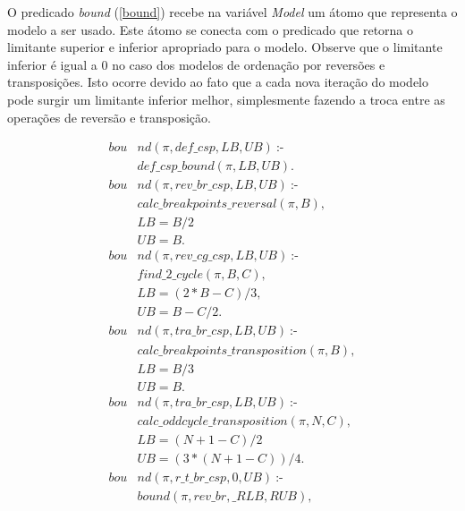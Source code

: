 O predicado \textit{bound} (\ref{bound}) recebe na
variável \textit{Model} um átomo que representa o modelo a ser
usado. Este átomo se conecta com o predicado que retorna o limitante
superior e inferior apropriado para o modelo. Observe que o limitante
inferior é igual a $0$ no caso dos modelos de ordenação por reversões
e transposições. Isto ocorre devido ao fato que a cada nova iteração
do modelo pode surgir um limitante inferior melhor, simplesmente
fazendo a troca entre as operações de reversão e transposição.

\begin{align}
  \label{bound}
  \textit{bou}&\textit{nd}(\pi, def\_csp, LB, UB)~\text{:-} \nonumber\\
  &\textit{def\_csp\_bound}(\pi, LB, UB). \nonumber \\
  \textit{bou}&\textit{nd}(\pi, rev\_br\_csp, LB, UB)~\text{:-} \nonumber \\
  &\textit{calc\_breakpoints\_reversal}(\pi, B), \nonumber\\
  &LB = B / 2 \nonumber \\ %
  &UB = B. \nonumber \\
  \textit{bou}&\textit{nd}(\pi, rev\_cg\_csp, LB, UB)~\text{:-} \nonumber \\
  &\textit{find\_2\_cycle}(\pi, B, C), \nonumber\\
  &LB = (2 * B - C) / 3 , \nonumber  \\
  &UB = B - C / 2. \nonumber \\
  \textit{bou}&\textit{nd}(\pi, tra\_br\_csp, LB, UB)~\text{:-} \nonumber\\
  &\textit{calc\_breakpoints\_transposition}(\pi, B), \nonumber\\
  &LB = B / 3 \nonumber \\ %
  &UB = B.  \nonumber \\
  \textit{bou}&\textit{nd}(\pi, tra\_br\_csp, LB, UB)~\text{:-} \\
  &\textit{calc\_oddcycle\_transposition}(\pi, N, C), \nonumber\\
  &LB = (N + 1 - C) / 2 \nonumber \\ 
  &UB = (3 * (N + 1 - C)) / 4. \nonumber \\
  \textit{bou}&\textit{nd}(\pi, r\_t\_br\_csp, 0, UB)~\text{:-} \nonumber\\
  &\textit{bound}(\pi, rev\_br, \_RLB, RUB), \nonumber\\

\end{align}
